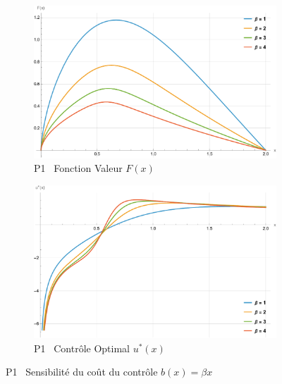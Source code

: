 \FloatBarrier\begin{figure}[htb]
    \centering
    \begin{subfigure}{0.49\linewidth}
        \includegraphics[width=\linewidth]{img/validation/P1/p1_B_value.pdf}
        \caption{P1 \textemdash~Fonction Valeur $F(x)$}\label{fig:BetaValueVisualisation1}
    \end{subfigure}
    \hfill
    \begin{subfigure}{0.49\linewidth}
        \includegraphics[width=\linewidth]{img/validation/P1/p1_B_control.pdf}
        \caption{P1 \textemdash~Contrôle Optimal $u^*(x)$}\label{fig:BetaControlVisualisation1}
    \end{subfigure}
    \caption{P1 \textemdash~Sensibilité du coût du contrôle $b(x)=\beta x$}\label{fig:BetaValueControlComparison}
\end{figure}
